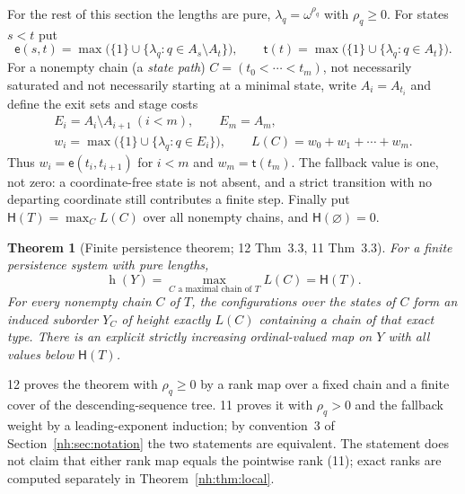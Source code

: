 \documentclass[11pt,a4paper]{article}
\newtheorem{theorem}{Theorem}[section]
\theoremstyle{definition}
\theoremstyle{remark}
\newcommand{\hgt}{\operatorname{h}}
\newcommand{\ew}{\mathsf e}
\newcommand{\tw}{\mathsf t}
\newcommand{\HH}{\mathsf H}
\begin{document}
For the rest of this section the lengths are pure,
$\lambda_q=\omega^{\rho_q}$ with $\rho_q\ge0$. For states $s<t$ put
\begin{equation}\label{nh:eq:weights}
 \ew(s,t)=\max\bigl(\{1\}\cup\{\lambda_q:q\in A_s\setminus A_t\}\bigr),
 \qquad
 \tw(t)=\max\bigl(\{1\}\cup\{\lambda_q:q\in A_t\}\bigr).
\end{equation}
For a nonempty chain (a \emph{state path}) $C=(t_0<\cdots<t_m)$, not
necessarily saturated and not necessarily starting at a minimal state, write
$A_i=A_{t_i}$ and define the exit sets and stage costs
\begin{equation}\label{nh:eq:chaincost}
 \begin{gathered}
 E_i=A_i\setminus A_{i+1}\ (i<m),\qquad E_m=A_m,\\
 w_i=\max\bigl(\{1\}\cup\{\lambda_q:q\in E_i\}\bigr),\qquad
 L(C)=w_0+w_1+\cdots+w_m .
 \end{gathered}
\end{equation}
Thus $w_i=\ew(t_i,t_{i+1})$ for $i<m$ and $w_m=\tw(t_m)$. The fallback value
is one, not zero: a coordinate-free state is not absent, and a strict
transition with no departing coordinate still contributes a finite step.
Finally put $\HH(T)=\max_C L(C)$ over all nonempty chains, and
$\HH(\varnothing)=0$.

\begin{theorem}[Finite persistence theorem; 12 Thm~3.3, 11 Thm~3.3]
\label{nh:thm:persistence}
For a finite persistence system with pure lengths,
\begin{equation}\label{nh:eq:persistence}
 \boxed{\hgt(Y)=\max_{C\text{ a maximal chain of }T}L(C)=\HH(T).}
\end{equation}
For every nonempty chain $C$ of $T$, the configurations over the states of
$C$ form an induced suborder $Y_C$ of height exactly $L(C)$ containing a chain
of that exact type. There is an explicit strictly increasing ordinal-valued
map on $Y$ with all values below $\HH(T)$.
\end{theorem}

12 proves the theorem with $\rho_q\ge0$ by a rank map over a fixed chain and a
finite cover of the descending-sequence tree. 11 proves it with $\rho_q>0$ and
the fallback weight by a leading-exponent induction; by convention~3 of
Section~\ref{nh:sec:notation} the two statements are equivalent. The
statement does not claim that either rank map equals the pointwise rank
(11); exact ranks are computed separately in
Theorem~\ref{nh:thm:local}.
\end{document}
